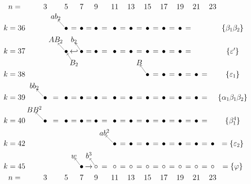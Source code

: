 \documentclass{article}
\begin{document}
\(
\begin{tikzcd}[
nodes={font=\Large,inner sep=0pt},
row sep=0.3cm,
column sep=0.1cm,
column 16/.append style={nodes={align=left,anchor=west}}
]
n= & & 3 & & 5 & & 7 & & 9 & & 11 & & 13 & & 15 & & 17 & & 19 & & 21 & & 23 & \\
& & & ab_2 & & \\ 
k=36 & & & & \bullet \arrow[lu] & = & \bullet & = & \bullet & = & \bullet & = & \bullet & = & \bullet & = & \bullet & = & \bullet & = & & & & \{\beta_1\beta_2\} \\
& & & AB_2 & & b_2 \\
k=37 & & & & \bullet \arrow[lu] & \hookleftarrow & \bullet \arrow[lu] & = & \bullet & = & \bullet & = & \bullet & = & \bullet & = & \bullet & = & \bullet & = & & & & \{\varepsilon'\}  \\
& & & & & B_2 \arrow[lu] & & & & & & & & B \\
k=38 & & & & & & & & & & & & & & \bullet \arrow[lu] & = & \bullet & = & \bullet & = & \bullet & = & & \{\varepsilon_1\} \\
& bb_2  & & & & & & & & & & \\ 
k=39 & & \bullet \arrow[lu] & = & \bullet & = & \bullet & = & \bullet & = & \bullet & = & \bullet & = & \bullet & = & \bullet & = & \bullet & = & \bullet & = & & \{\alpha_1\beta_1\beta_2\} \\
& BB^2 & & & &  \\
k=40 & & \bullet \arrow[lu] & = & \bullet & = & \bullet & = & \bullet & = & \bullet & = & \bullet & = & \bullet & = & \bullet & = & \bullet & = & \bullet & = & & \{\beta_1^4\} \\
& & & & & & & & & ab^2 \\
k=42 & & & & & & & & & & \bullet \arrow[lu] & = & \bullet & = & \bullet & = & \bullet & = & \bullet & = & \bullet & = & \bullet & =\{\varepsilon_2\} \\
& & & & & w & & b^3 \\ 
k=45 & & & & & & \bullet \arrow[lu] & \rightarrow & \circ \arrow[lu] & = & \circ & = & \circ & = & \circ & = & \circ & = & \circ & = & \circ & = & \circ & = \{\varphi\} \\
n= & & 3 & & 5 & & 7 & & 9 & & 11 & & 13 & & 15 & & 17 & & 19 & & 21 & & 23 & \\
\end{tikzcd}
\)
\end{document}
